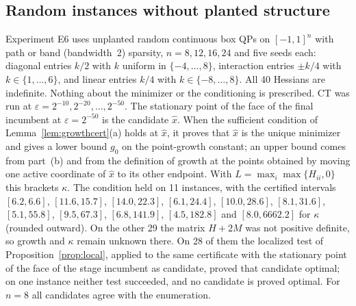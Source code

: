 \subsection{Random instances without planted structure}\label{sec:comp-random}
Experiment E6 uses unplanted random continuous box QPs on $[-1,1]^n$ with path
or band (bandwidth~2) sparsity, $n=8,12,16,24$ and five seeds each: diagonal
entries $k/2$ with $k$ uniform in $\{-4,\dots,8\}$, interaction entries $\pm
k/4$ with $k\in\{1,\dots,6\}$, and linear entries $k/4$ with
$k\in\{-8,\dots,8\}$. All 40 Hessians are indefinite. Nothing about the
minimizer or the conditioning is prescribed. CT was run at
$\varepsilon=2^{-10},2^{-20},\dots,2^{-50}$. The stationary point of the face
of the final incumbent at $\varepsilon=2^{-50}$ is the candidate $\hat x$.
When the sufficient condition of Lemma~\ref{lem:growthcert}(a) holds at
$\hat x$, it proves that $\hat x$ is the unique minimizer and gives a lower
bound $g_0$ on the point-growth constant; an upper bound comes from part~(b) and
from the definition of growth at the points obtained by moving one active
coordinate of $\hat x$ to its other endpoint. With
$L=\max_i\max\{H_{ii},0\}$ this brackets $\kappa$. The condition held on 11
instances, with the certified intervals $[6.2,6.6]$, $[11.6,15.7]$,
$[14.0,22.3]$, $[6.1,24.4]$, $[10.0,28.6]$, $[8.1,31.6]$, $[5.1,55.8]$,
$[9.5,67.3]$, $[6.8,141.9]$, $[4.5,182.8]$ and $[8.0,6662.2]$ for $\kappa$
(rounded outward). On the
other 29 the matrix $H+2M$ was not positive definite, so growth and $\kappa$
remain unknown there. On 28 of them the localized test of
Proposition~\ref{prop:local}, applied to the same certificate with the
stationary point of the face of the stage incumbent as candidate, proved that
candidate optimal; on one instance neither test succeeded, and no candidate is
proved optimal. For $n=8$ all candidates agree with the enumeration.

